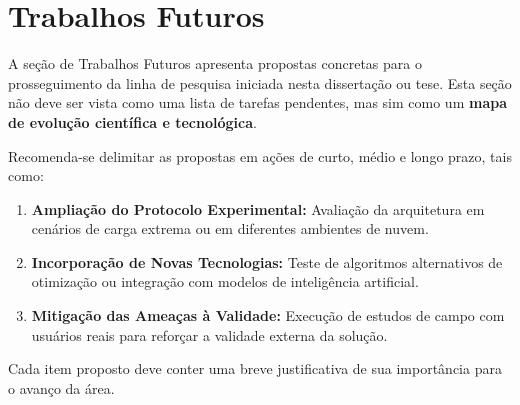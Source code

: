 \chapter{Trabalhos Futuros}
\label{chap:trabalhos_futuros}

A seção de Trabalhos Futuros apresenta propostas concretas para o prosseguimento da linha de pesquisa iniciada nesta dissertação ou tese. Esta seção não deve ser vista como uma lista de tarefas pendentes, mas sim como um \textbf{mapa de evolução científica e tecnológica}.

Recomenda-se delimitar as propostas em ações de curto, médio e longo prazo, tais como:
\begin{enumerate}
    \item \textbf{Ampliação do Protocolo Experimental:} Avaliação da arquitetura em cenários de carga extrema ou em diferentes ambientes de nuvem.
    \item \textbf{Incorporação de Novas Tecnologias:} Teste de algoritmos alternativos de otimização ou integração com modelos de inteligência artificial.
    \item \textbf{Mitigação das Ameaças à Validade:} Execução de estudos de campo com usuários reais para reforçar a validade externa da solução.
\end{enumerate}

Cada item proposto deve conter uma breve justificativa de sua importância para o avanço da área.
